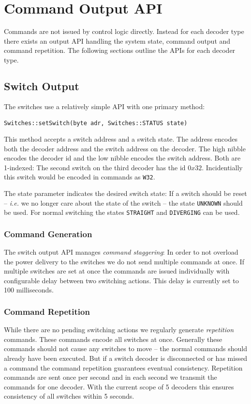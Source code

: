 \documentclass{scrreprt}
\newcommand\ie{\emph{i.e. }}
\newcommand{\code}[1]{\texttt{#1}}
\begin{document}
\section{Command Output API}
Commands are not issued by control logic directly.
Instead for each decoder type there exists an output API handling the system state, command output and command repetition.
The following sections outline the APIs for each decoder type.

\subsection{Switch Output}
The switches use a relatively simple API with one primary method:

\code{Switches::setSwitch(byte adr, Switches::STATUS state)}

This method accepts a switch address and a switch state.
The address encodes both the decoder address and the switch address on the decoder.
The high nibble encodes the decoder id and the low nibble encodes the switch address.
Both are 1-indexed:
The second switch on the third decoder has the id $0x32$.
Incidentially this switch would be encoded in commands as \code{W32}.

The state parameter indicates the desired switch state: If a switch should be reset -- \ie we no longer care about the state of the switch -- the state \code{UNKNOWN} should be used.
For normal switching the states \code{STRAIGHT} and \code{DIVERGING} can be used.

\subsubsection{Command Generation}
The switch output API manages \emph{command staggering}:
In order to not overload the power delivery to the switches we do not send multiple commands at once.
If multiple switches are set at once the commands are issued individually with configurable delay between two switching actions.
This delay is currently set to 100 milliseconds.

\subsubsection{Command Repetition}
While there are no pending switching actions we regularly generate \emph{repetition} commands.
These commands encode all switches at once.
Generally these commands should not cause any switches to move -- the normal commands should already have been executed.
But if a switch decoder is disconnected or has missed a command the command repetition guarantees eventual consistency.
Repetition commands are sent once per second and in each second we transmit the commands for one decoder.
With the current scope of 5 decoders this ensures consistency of all switches within 5 seconds.
\end{document}
